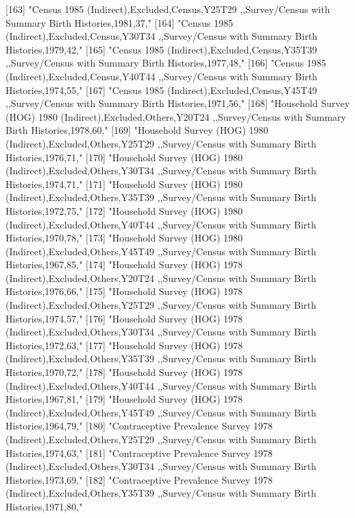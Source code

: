 [163] "Census 1985 (Indirect),Excluded,Census,Y25T29 ,,Survey/Census with Summary Birth Histories,1981,37,"                          
[164] "Census 1985 (Indirect),Excluded,Census,Y30T34 ,,Survey/Census with Summary Birth Histories,1979,42,"                          
[165] "Census 1985 (Indirect),Excluded,Census,Y35T39 ,,Survey/Census with Summary Birth Histories,1977,48,"                          
[166] "Census 1985 (Indirect),Excluded,Census,Y40T44 ,,Survey/Census with Summary Birth Histories,1974,55,"                          
[167] "Census 1985 (Indirect),Excluded,Census,Y45T49 ,,Survey/Census with Summary Birth Histories,1971,56,"                          
[168] "Household Survey (HOG) 1980 (Indirect),Excluded,Others,Y20T24 ,,Survey/Census with Summary Birth Histories,1978,60,"          
[169] "Household Survey (HOG) 1980 (Indirect),Excluded,Others,Y25T29 ,,Survey/Census with Summary Birth Histories,1976,71,"          
[170] "Household Survey (HOG) 1980 (Indirect),Excluded,Others,Y30T34 ,,Survey/Census with Summary Birth Histories,1974,71,"          
[171] "Household Survey (HOG) 1980 (Indirect),Excluded,Others,Y35T39 ,,Survey/Census with Summary Birth Histories,1972,75,"          
[172] "Household Survey (HOG) 1980 (Indirect),Excluded,Others,Y40T44 ,,Survey/Census with Summary Birth Histories,1970,78,"          
[173] "Household Survey (HOG) 1980 (Indirect),Excluded,Others,Y45T49 ,,Survey/Census with Summary Birth Histories,1967,85,"          
[174] "Household Survey (HOG) 1978 (Indirect),Excluded,Others,Y20T24 ,,Survey/Census with Summary Birth Histories,1976,66,"          
[175] "Household Survey (HOG) 1978 (Indirect),Excluded,Others,Y25T29 ,,Survey/Census with Summary Birth Histories,1974,57,"          
[176] "Household Survey (HOG) 1978 (Indirect),Excluded,Others,Y30T34 ,,Survey/Census with Summary Birth Histories,1972,63,"          
[177] "Household Survey (HOG) 1978 (Indirect),Excluded,Others,Y35T39 ,,Survey/Census with Summary Birth Histories,1970,72,"          
[178] "Household Survey (HOG) 1978 (Indirect),Excluded,Others,Y40T44 ,,Survey/Census with Summary Birth Histories,1967,81,"          
[179] "Household Survey (HOG) 1978 (Indirect),Excluded,Others,Y45T49 ,,Survey/Census with Summary Birth Histories,1964,79,"          
[180] "Contraceptive Prevalence Survey 1978 (Indirect),Excluded,Others,Y25T29 ,,Survey/Census with Summary Birth Histories,1974,63," 
[181] "Contraceptive Prevalence Survey 1978 (Indirect),Excluded,Others,Y30T34 ,,Survey/Census with Summary Birth Histories,1973,69," 
[182] "Contraceptive Prevalence Survey 1978 (Indirect),Excluded,Others,Y35T39 ,,Survey/Census with Summary Birth Histories,1971,80," 
